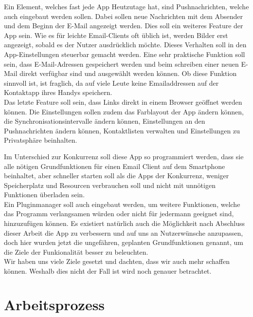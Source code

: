 \documentclass[a4paper,11pt]{article}
\begin{document}
Ein Element, welches fast jede App Heutzutage hat, sind Pushnachrichten, welche auch eingebaut werden sollen. Dabei sollen neue Nachrichten mit dem Absender und dem Beginn der E-Mail angezeigt werden. 
Dies soll ein weiteres Feature der App sein. Wie es für leichte Email-Clients oft üblich ist, werden Bilder erst angezeigt, sobald es der Nutzer ausdrücklich möchte. Dieses Verhalten soll in den App-Einstellungen steuerbar gemacht werden. Eine sehr praktische Funktion soll sein, dass E-Mail-Adressen gespeichert werden und beim schreiben einer neuen E-Mail direkt verfügbar sind und ausgewählt werden können. Ob diese Funktion sinnvoll ist, ist fraglich, da auf viele Leute keine Emailaddressen auf der Kontaktapp ihres Handys speichern.\\

Das letzte Feature soll sein, dass Links direkt in einem Browser geöffnet werden können. Die Einstellungen sollen zudem das Farblayout der App ändern können, die Synchronisationsintervalle ändern können, Einstellungen an den Pushnachrichten ändern können, Kontaktlisten verwalten und Einstellungen zu Privatsphäre beinhalten.


Im Unterschied zur Konkurrenz soll diese App so programmiert werden, dass sie alle nötigen Grundfunktionen für einen Email Client auf dem Smartphone beinhaltet, aber schneller starten soll als die Apps der Konkurrenz, weniger Speicherplatz und Resourcen verbrauchen soll und nicht mit unnötigen Funktionen überladen sein. \\


Ein Pluginmanager soll auch eingebaut werden, um weitere Funktionen, welche das Programm verlangsamen würden oder nicht für jedermann geeignet sind, hinzuzufügen können. Es existiert natürlich auch die Möglichkeit nach Abschluss dieser Arbeit die App zu verbessern und auf uns an Nutzerwünsche anzupassen, doch hier wurden jetzt die ungefähren, geplanten Grundfunktionen genannt, um die Ziele der Funkionalität besser zu beleuchten.\\
Wir haben uns viele Ziele gesetzt und dachten, dass wir auch mehr schaffen können. Weshalb dies nicht der Fall ist wird noch genauer betrachtet. 




\section{Arbeitsprozess}
\end{document}
